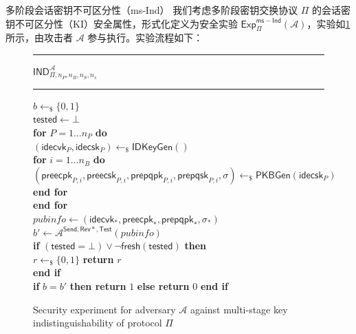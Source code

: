 \begin{definition}{多阶段会话密钥不可区分性（ms-Ind）}
我们考虑多阶段密钥交换协议 $\Pi$ 的会话密钥不可区分性（KI）安全属性，形式化定义为安全实验 $\mathsf{Exp}_{\Pi}^{\mathsf{ms-Ind}}(\mathcal{A})$，实验如\ref{fig:security-experiment}所示，由攻击者 $\mathcal{A}$ 参与执行。实验流程如下：
\begin{figure}[htbp]
    \centering
    \caption{Security experiment for adversary $\mathcal{A}$ against multi-stage key indistinguishability of protocol $\Pi$}
    \label{fig:security-experiment}
    \footnotesize

    \newcommand{\algtitle}[1]{%
        \settowidth{\tmpwd}{\textbf{#1}}%
        \textbf{#1}\\[-2pt]%
        \rule{\tmpwd}{0.4pt}%
        \vspace{1mm}%
    }
    \newlength{\tmpwd}

    \begin{minipage}[t]{0.48\textwidth}
        \hrule height 0.8pt
        \vspace{1mm}
        \algtitle{$\mathsf{IND}_{\Pi,n_P,n_B,n_S,n_s}^{\mathcal{A}}$}

        $b \gets_{\$} \{0,1\}$ \\
        $\mathsf{tested} \gets \bot$ \\
        \textbf{for} $P = 1 \dots n_P$ \textbf{do} \\
        \hspace{4mm} $(\mathsf{idecvk}_P, \mathsf{idecsk}_P) \gets_{\$} \mathsf{IDKeyGen}()$ \\
        \hspace{4mm} \textbf{for} $i = 1 \dots n_B$ \textbf{do} \\
        \hspace{8mm} $(\mathsf{preecpk}_{P,i}, \mathsf{preecsk}_{P,i}, \mathsf{prepqpk}_{P,i}, \mathsf{prepqsk}_{P,i}, \sigma) \gets_{\$} \mathsf{PKBGen}(\mathsf{idecsk}_P)$ \\
        \hspace{4mm} \textbf{end for} \\
        \textbf{end for} \\
        $\mathit{pubinfo} \gets (\mathsf{idecvk}_*, \mathsf{preecpk}_*, \mathsf{prepqpk}_*, \sigma_*)$ \\
        $b' \gets \mathcal{A}^{\mathsf{Send},\mathsf{Rev*},\mathsf{Test}}(\mathit{pubinfo})$ \\
        \textbf{if} $(\mathsf{tested} = \bot) \lor \neg \mathsf{fresh}(\mathsf{tested})$ \textbf{then} \\
        \hspace{4mm} $r \gets_{\$} \{0,1\}$ \textbf{ return} $r$ \\
        \textbf{end if} \\
        \textbf{if} $b = b'$ \textbf{then return} $1$ \textbf{ else return} $0$ \textbf{ end if}


\end{minipage}
\end{figure}
\end{definition}
